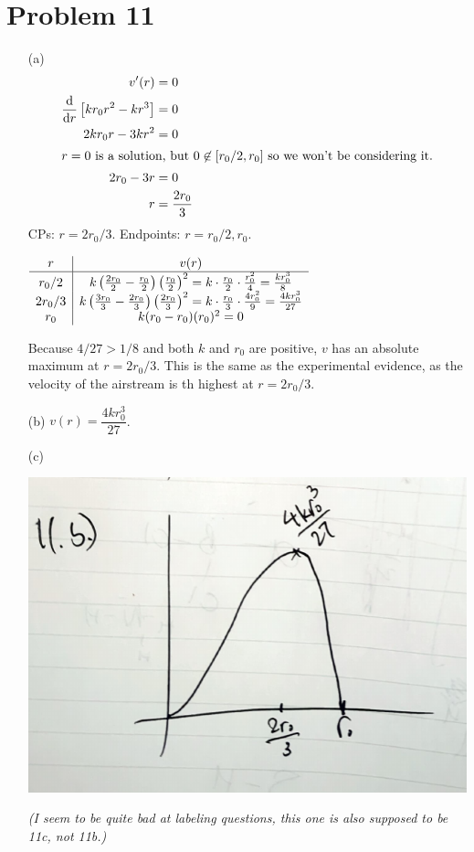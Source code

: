 \documentclass{article}
\newcommand*{\paren}[1]{\ensuremath\left(#1\right)}
\newcommand*{\problem}[1]{\section*{Problem #1}}
\newcommand*{\Deriv}[2][x]{\ensuremath{\dfrac{\mathrm{d}}{\mathrm{d}#1}\left[#2\right]}}
\begin{document}
\problem{11}
\begin{itemize}
	\item[(a)]
	\begin{align*}
		v'(r)&=0 \\
		\Deriv[r]{kr_0r^2-kr^3}&=0 \\
		2kr_0r-3kr^2&=0 \\
		\intertext{$r=0$ is a solution, but $0\not\in[r_0/2,r_0]$ so we won't be considering it.}
		2r_0-3r&=0 \\
		r&=\frac{2r_0}{3}
	\end{align*}
	CPs: $r=2r_0/3$. Endpoints: $r=r_0/2,r_0$.
	\begin{center}
		$\begin{array}{c|c}
			r & v(r) \\
			\hline
			r_0/2 & k\paren{\frac{2r_0}{2}-\frac{r_0}{2}}\paren{\frac{r_0}{2}}^2=k\cdot\frac{r_0}{2}\cdot\frac{r_0^2}{4}=\frac{kr_0^3}{8} \\
			2r_0/3 & k\paren{\frac{3r_0}{3}-\frac{2r_0}{3}}\paren{\frac{2r_0}{3}}^2=k\cdot\frac{r_0}{3}\cdot\frac{4r_0^2}{9}=\frac{4kr_0^3}{27} \\
			r_0 & k(r_0-r_0)(r_0)^2=0
		\end{array}$
	\end{center}
	Because $4/27>1/8$ and both $k$ and $r_0$ are positive, $v$ has an absolute maximum at $r=2r_0/3$. This is the same as the experimental evidence, as the velocity of the airstream is th highest at $r=2r_0/3$.

	\item[(b)]
	$v(r)=\dfrac{4kr_0^3}{27}$.

	\item[(c)]
	\phantom{}
	
	\begin{center}
		\includegraphics*[width=0.6\linewidth]{q11c.png}

		\textit{(I seem to be quite bad at labeling questions, this one is also supposed to be 11c, not 11b.)}
	\end{center}
\end{itemize}
\end{document}
